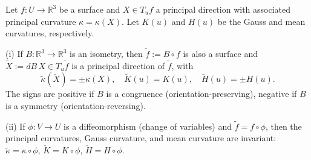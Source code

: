 Let $f: U \to \mathbb{R}^3$ be a surface and $X \in T_u f$ a principal direction with associated principal curvature $\kappa = \kappa(X)$. Let $K(u)$ and $H(u)$ be the Gauss and mean curvatures, respectively.

(i) If $B: \mathbb{R}^3 \to \mathbb{R}^3$ is an isometry, then $\tilde{f} := B \circ f$ is also a surface and $\tilde{X} := dB \, X \in T_u \tilde{f}$ is a principal direction of $\tilde{f}$, with
$$\tilde{\kappa}(\tilde{X}) = \pm \kappa(X), \quad \tilde{K}(u) = K(u), \quad \tilde{H}(u) = \pm H(u).$$
The signs are positive if $B$ is a congruence (orientation-preserving), negative if $B$ is a symmetry (orientation-reversing).

(ii) If $\phi: V \to U$ is a diffeomorphism (change of variables) and $\tilde{f} = f \circ \phi$, then the principal curvatures, Gauss curvature, and mean curvature are invariant: $\tilde{\kappa} = \kappa \circ \phi$, $\tilde{K} = K \circ \phi$, $\tilde{H} = H \circ \phi$.
